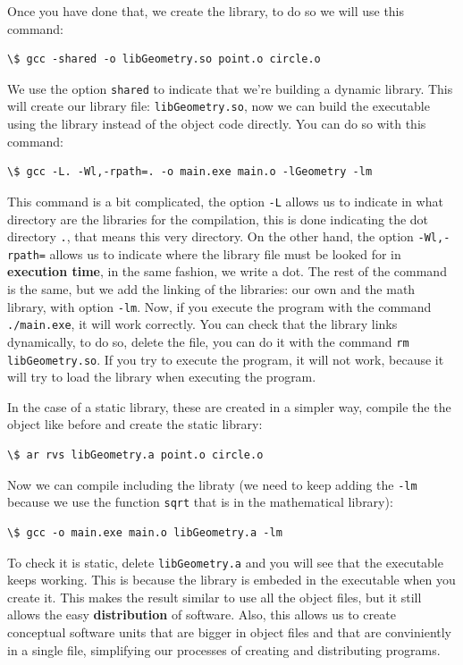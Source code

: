 \documentclass[a4paper]{article}
\begin{document}
Once you have done that, we create the library, to do so we will use this
command:
\begin{lstlisting}[style=terminalStyle]
\$ gcc -shared -o libGeometry.so point.o circle.o
\end{lstlisting}

We use the option \verb!shared! to indicate that we're building a dynamic
library. This will create our library file: \verb!libGeometry.so!, now we
can build the executable using the library instead of the object code directly.
You can do so with this command:
\begin{lstlisting}[style=terminalStyle]
\$ gcc -L. -Wl,-rpath=. -o main.exe main.o -lGeometry -lm
\end{lstlisting}

This command is a bit complicated, the option \verb!-L! allows us to indicate in
what directory are the libraries for the compilation, this is done indicating
the dot directory \verb!.!, that means this very directory. On the other hand,
the option \verb!-Wl,-rpath=! allows us to indicate where the library file must
be looked for in \textbf{execution time}, in the same fashion, we write a dot.
The rest of the command is the same, but we add the linking of the libraries:
our own and the math library, with option \verb!-lm!. Now, if you execute the
program with the command \verb!./main.exe!, it will work correctly. You can
check that the library links dynamically, to do so, delete the file, you can do
it with the command \verb!rm libGeometry.so!. If you try to execute the program,
it will not work, because it will try to load the library when executing the
program.

In the case of a static library, these are created in a simpler way, compile the
the object like before and create the static library:
\begin{lstlisting}[style=terminalStyle]
\$ ar rvs libGeometry.a point.o circle.o
\end{lstlisting}

Now we can compile including the libraty (we need to keep adding the \verb!-lm!
because we use the function \verb!sqrt! that is in the mathematical library):
\begin{lstlisting}[style=terminalStyle]
\$ gcc -o main.exe main.o libGeometry.a -lm
\end{lstlisting}

To check it is static, delete \verb!libGeometry.a! and you will see that the
executable keeps working. This is because the library is embeded in the
executable when you create it. This makes the result similar to use all the
object files, but it still allows the easy \textbf{distribution} of software.
Also, this allows us to create conceptual software units that are bigger in
object files and that are conviniently in a single file, simplifying our
processes of creating and distributing programs.
\end{document}
